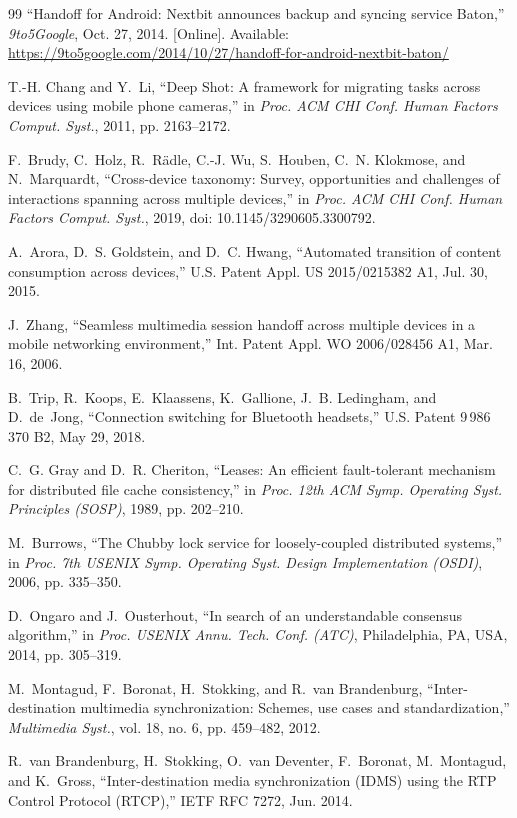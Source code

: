 \documentclass[conference]{IEEEtran}
\begin{document}
\begin{thebibliography}{99}
``Handoff for Android: Nextbit announces backup and syncing service Baton,'' \emph{9to5Google}, Oct. 27, 2014. [Online]. Available: \url{https://9to5google.com/2014/10/27/handoff-for-android-nextbit-baton/}

T.-H. Chang and Y.~Li, ``Deep Shot: A framework for migrating tasks across devices using mobile phone cameras,'' in \emph{Proc. ACM CHI Conf. Human Factors Comput. Syst.}, 2011, pp. 2163--2172.

F.~Brudy, C.~Holz, R.~R{\"a}dle, C.-J. Wu, S.~Houben, C.~N. Klokmose, and N.~Marquardt, ``Cross-device taxonomy: Survey, opportunities and challenges of interactions spanning across multiple devices,'' in \emph{Proc. ACM CHI Conf. Human Factors Comput. Syst.}, 2019, doi: 10.1145/3290605.3300792.

A.~Arora, D.~S. Goldstein, and D.~C. Hwang, ``Automated transition of content consumption across devices,'' U.S. Patent Appl. US 2015/0215382 A1, Jul. 30, 2015.

J.~Zhang, ``Seamless multimedia session handoff across multiple devices in a mobile networking environment,'' Int. Patent Appl. WO 2006/028456 A1, Mar. 16, 2006.

B.~Trip, R.~Koops, E.~Klaassens, K.~Gallione, J.~B. Ledingham, and D.~de~Jong, ``Connection switching for Bluetooth headsets,'' U.S. Patent 9\,986\,370 B2, May 29, 2018.

C.~G. Gray and D.~R. Cheriton, ``Leases: An efficient fault-tolerant mechanism for distributed file cache consistency,'' in \emph{Proc. 12th ACM Symp. Operating Syst. Principles (SOSP)}, 1989, pp. 202--210.

M.~Burrows, ``The Chubby lock service for loosely-coupled distributed systems,'' in \emph{Proc. 7th USENIX Symp. Operating Syst. Design Implementation (OSDI)}, 2006, pp. 335--350.

D.~Ongaro and J.~Ousterhout, ``In search of an understandable consensus algorithm,'' in \emph{Proc. USENIX Annu. Tech. Conf. (ATC)}, Philadelphia, PA, USA, 2014, pp. 305--319.

M.~Montagud, F.~Boronat, H.~Stokking, and R.~van Brandenburg, ``Inter-destination multimedia synchronization: Schemes, use cases and standardization,'' \emph{Multimedia Syst.}, vol. 18, no. 6, pp. 459--482, 2012.

R.~van Brandenburg, H.~Stokking, O.~van Deventer, F.~Boronat, M.~Montagud, and K.~Gross, ``Inter-destination media synchronization (IDMS) using the RTP Control Protocol (RTCP),'' IETF RFC 7272, Jun. 2014.


\end{thebibliography}
\end{document}
